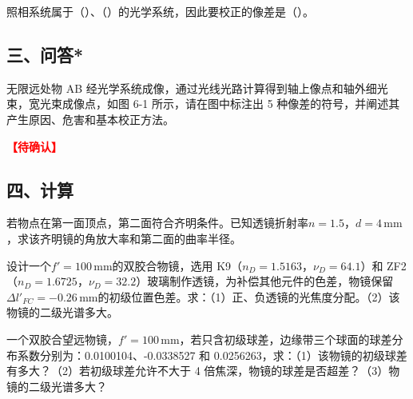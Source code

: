\documentclass[padl, analysis, notocnum]{ExBook}
\newcommand{\answerarea}[1][3.5cm]{%
  \par\vspace{1mm}%
  \noindent{\color{themeColor!35}\rule{\linewidth}{0.4pt}}\par
  \noindent\begin{minipage}[t][#1][t]{\linewidth}\vspace{0pt}\end{minipage}\par
  \noindent{\color{themeColor!35}\rule{\linewidth}{0.4pt}}\par
}
\newcommand{\tbd}{\textcolor{red}{\textbf{【待确认】}}}
\begin{document}
\begin{qitems}[startnum=13]
\qitem 照相系统属于（\hspace{1.6em}）、（\hspace{1.6em}）的光学系统，因此要校正的像差是（\hspace{1.6em}）。
\label{q:126:start}
\answerarea[4.0cm]
\label{q:126:end}
\end{qitems}

\subsection{三、问答*}
\begin{qitems}[unshow,suffix={}]
\qitem 无限远处物 AB 经光学系统成像，通过光线光路计算得到轴上像点和轴外细光束，宽光束成像点，如图 6-1 所示，请在图中标注出 5 种像差的符号，并阐述其产生原因、危害和基本校正方法。
\par\noindent\tbd
{}
\label{q:127:start}
\answerarea[2.4cm]
\label{q:127:end}
\end{qitems}

\subsection{四、计算}
\begin{qitems}[startnum=1]
\qitem 若物点在第一面顶点，第二面符合齐明条件。已知透镜折射率$n=1.5$，$d=4\,\mathrm{mm}$，求该齐明镜的角放大率和第二面的曲率半径。
\label{q:128:start}
\answerarea[7.0cm]
\label{q:128:end}
\end{qitems}

\begin{qitems}[startnum=2]
\qitem 设计一个$f'=100\,\mathrm{mm}$的双胶合物镜，选用 K9（$n_{D}=1.5163$，$\nu_{D}=64.1$）和 ZF2（$n_{D}=1.6725$，$\nu_{D}=32.2$）玻璃制作透镜，为补偿其他元件的色差，物镜保留$\Delta l'_{FC}=-0.26\,\mathrm{mm}$的初级位置色差。求：（1）正、负透镜的光焦度分配。（2）该物镜的二级光谱多大。
\label{q:129:start}
\answerarea[7.0cm]
\label{q:129:end}
\end{qitems}

\begin{qitems}[startnum=3]
\qitem 一个双胶合望远物镜，$f'=100\,\mathrm{mm}$，若只含初级球差，边缘带三个球面的球差分布系数分别为：0.0100104、-0.0338527 和 0.0256263，求：（1）该物镜的初级球差有多大？（2）若初级球差允许不大于 4 倍焦深，物镜的球差是否超差？（3）物镜的二级光谱多大？
\label{q:130:start}
\answerarea[7.0cm]
\label{q:130:end}
\end{qitems}
\end{document}
